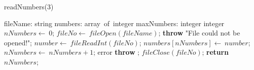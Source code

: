 \documentclass[a4paper,10pt]{article}
\begin{document}
\begin{algorithm}
\caption{readNumbers(3)}
\begin{algorithmic}[5]
\State {}
\State {}
\State {}
    \State fileName: string
    \State numbers: array\ of\ integer
    \State maxNumbers: integer
  \EndDecl
    \State integer
  \EndDecl
  \State \(nNumbers\gets\ 0\);
  \State \(fileNo\gets\ fileOpen(fileName)\);
    \State \textbf{throw} \(\)"{}File could not be opened!"{}\(\);
  \EndIf
  \Try
      \State \(number\gets\ fileReadInt(fileNo)\);
      \State \(numbers[nNumbers]\gets\ number\);
      \State \(nNumbers\gets\ nNumbers+1\);
    \EndWhile
  \EndTry
  \Catch error
    \State \textbf{throw} \(\);
  \EndCatch %
  \Finally
    \State \(fileClose(fileNo)\);
  \EndFinally
  \State \textbf{return} \(nNumbers\);
\EndFunction
\end{algorithmic}
\end{algorithm}
\end{document}
